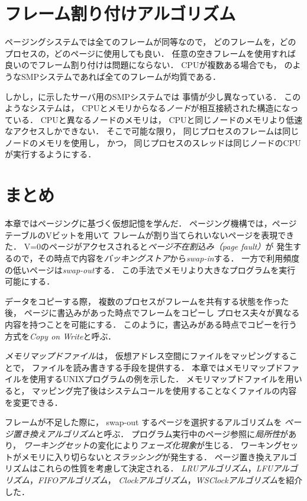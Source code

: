 \section{フレーム割り付けアルゴリズム}\label{frameAllocation}
ページングシステムでは全てのフレームが同等なので，
どのフレームを，どのプロセスの，どのページに使用しても良い．
任意の空きフレームを使用すれば良いのでフレーム割り付けは問題にならない．
CPUが複数ある場合でも，
のようなSMPシステムであれば全てのフレームが均質である．

しかし，に示したサーバ用のSMPシステムでは
事情が少し異なっている．
このようなシステムは，
CPUとメモリからなる\emph{ノード}が相互接続された構造になっている．
CPUと異なるノードのメモリは，
CPUと同じノードのメモリより低速なアクセスしかできない．
そこで可能な限り，
同じプロセスのフレームは同じノードのメモリを使用し，
かつ，
同じプロセスのスレッドは同じノードのCPUが実行するようにする．

\section{まとめ}
本章ではページングに基づく仮想記憶を学んだ．
ページング機構では，ページテーブルのVビットを用いて
フレームが割り当てられいないページを表現できた．
V=0のページがアクセスされると\emph{ページ不在割込み（page fault）}が
発生するので，その時点で内容を\emph{バッキングストア}から\emph{swap-in}する．
一方で利用頻度の低いページは\emph{swap-out}する．
この手法でメモリより大きなプログラムを実行可能にする．

データをコピーする際，
複数のプロセスがフレームを共有する状態を作った後，
ページに書込みがあった時点でフレームをコピーし
プロセス夫々が異なる内容を持つことを可能にする．
このように，書込みがある時点でコピーを行う方式を\emph{Copy on Write}と呼ぶ．

\emph{メモリマップドファイル}は，
仮想アドレス空間にファイルをマッピングすることで，
ファイルを読み書きする手段を提供する．
本章ではメモリマップドファイルを使用するUNIXプログラムの例を示した．
メモリマップドファイルを用いると，
マッピング完了後はシステムコールを使用することなくファイルの内容を変更できる．

フレームが不足した際に，
swap-out するページを選択するアルゴリズムを
\emph{ページ置き換えアルゴリズム}と呼ぶ．
プログラム実行中のページ参照に\emph{局所性}があり，
\emph{ワーキングセット}の変化により\emph{フェーズ化現象}が生じる．
ワーキングセットがメモリに入り切らないと\emph{スラッシング}が発生する．
ページ置き換えアルゴリズムはこれらの性質を考慮して決定される．
\emph{LRUアルゴリズム}，\emph{LFUアルゴリズム}，\emph{FIFOアルゴリズム}，
\emph{Clockアルゴリズム}，\emph{WSClockアルゴリズム}を紹介した．

